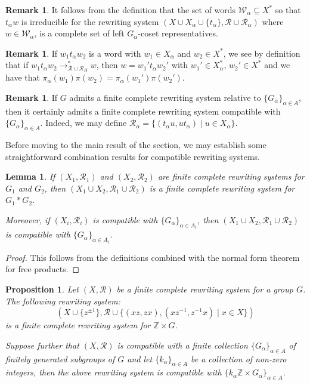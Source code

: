 \documentclass[12pt, a4paper]{amsart}
\newtheorem{lemma}[theorem]{Lemma}
\newtheorem{proposition}[theorem]{Proposition}
\theoremstyle{definition}
\newtheorem{remark}[theorem]{Remark}
\newcommand{\Z}{\mathbb{Z}}
\begin{document}
\begin{remark}
\label{rem:coset_reps}
It follows from the definition that the set of words $\mathcal{W}_{\alpha}\subseteq X^*$ so that $t_{\alpha}w$ is irreducible for the rewriting system $(X\cup X_\alpha\cup\{t_\alpha\}, \mathcal{R}\cup \mathcal{R}_\alpha)$ where $w\in \mathcal{W}_{\alpha}$, is a complete set of left $G_{\alpha}$-coset representatives.
\end{remark}

\begin{remark}
If $w_1t_{\alpha}w_2$ is a word with $w_1\in X_{\alpha}$ and $w_2\in X^*$, we see by definition that if $w_1t_{\alpha}w_2\to_{\mathcal{R}\cup \mathcal{R}_H}^*w$, then $w = w_1't_{\alpha}w_2'$ with $w_1'\in X_{\alpha}^*$, $w_2'\in X^*$ and we have that $\pi_{\alpha}(w_1)\pi(w_2) = \pi_{\alpha}(w_1')\pi(w_2')$.
\end{remark}

\begin{remark}
If $G$ admits a finite complete rewriting system relative to $\{G_{\alpha}\}_{\alpha\in A}$, then it certainly admits a finite complete rewriting system compatible with $\{G_{\alpha}\}_{\alpha\in A}$. Indeed, we may define $\mathcal{R}_{\alpha} = \{(t_{\alpha}u, ut_{\alpha}) \mid u\in X_{\alpha}\}$.
\end{remark}



Before moving to the main result of the section, we may establish some straightforward combination results for compatible rewriting systems.


\begin{lemma}
\label{lem:join}
If $(X_1, \mathcal{R}_1)$ and $(X_2, \mathcal{R}_2)$ are finite complete rewriting systems for $G_1$ and $G_2$, then $(X_1\cup X_2, \mathcal{R}_1\cup \mathcal{R}_2)$ is a finite complete rewriting system for $G_1*G_2$.

Moreover, if $(X_i, \mathcal{R}_i)$ is compatible with $\{G_{\alpha}\}_{\alpha\in A_i}$, then $(X_1\cup X_2, \mathcal{R}_1\cup \mathcal{R}_2)$ is compatible with $\{G_{\alpha}\}_{\alpha\in A_i}$.
\end{lemma}

\begin{proof}
This follows from the definitions combined with the normal form theorem for free products.
\end{proof}



\begin{proposition}
\label{prop:prod}
Let $(X, \mathcal{R})$ be a finite complete rewriting system for a group $G$. The following rewriting system:
\[
(X\cup \{z^{\pm1}\}, \mathcal{R}\cup \{(xz, zx), (xz^{-1}, z^{-1}x) \mid x\in X\})
\] 
is a finite complete rewriting system for $\Z\times G$. 

Suppose further that $(X, \mathcal{R})$ is compatible with a finite collection $\{G_{\alpha}\}_{\alpha\in A}$ of finitely generated subgroups of $G$ and let $\{k_{\alpha}\}_{\alpha\in A}$ be a collection of non-zero integers, then the above rewriting system is compatible with $\{k_{\alpha}\Z\times G_{\alpha}\}_{\alpha\in A}$.
\end{proposition}
\end{document}
